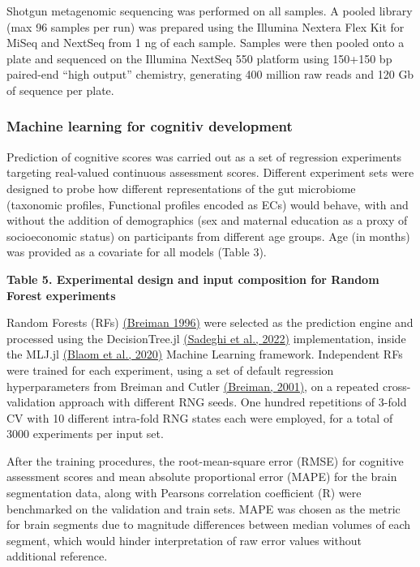 Shotgun metagenomic sequencing was performed on all samples. A pooled
library (max 96 samples per run) was prepared using the Illumina Nextera
Flex Kit for MiSeq and NextSeq from 1 ng of each sample. Samples were
then pooled onto a plate and sequenced on the Illumina NextSeq 550
platform using 150+150 bp paired-end ``high output'' chemistry,
generating 400 million raw reads and 120 Gb of sequence per plate.

\subsubsection{Machine learning for cognitiv
development}

Prediction of cognitive scores was carried out as a set of regression
experiments targeting real-valued continuous assessment scores.
Different experiment sets were designed to probe how different
representations of the gut microbiome (taxonomic profiles, Functional
profiles encoded as ECs) would behave, with and without the addition of
demographics (sex and maternal education as a proxy of socioeconomic
status) on participants from different age groups. Age (in months) was
provided as a covariate for all models (Table 3).

\textbf{Table 5. Experimental design and input composition for Random
Forest experiments}



Random Forests (RFs) \href{https://paperpile.com/c/dPbU4e/VDqU}{(Breiman
1996)} were selected as the prediction engine and processed using the
DecisionTree.jl
\href{https://www.zotero.org/google-docs/?dQLyDs}{(Sadeghi et al.,
2022)} implementation, inside the MLJ.jl
\href{https://www.zotero.org/google-docs/?y8ywGI}{(Blaom et al., 2020)}
Machine Learning framework. Independent RFs were trained for each
experiment, using a set of default regression hyperparameters from
Breiman and Cutler
\href{https://www.zotero.org/google-docs/?d3gqFh}{(Breiman, 2001)}, on a
repeated cross-validation approach with different RNG seeds. One hundred
repetitions of 3-fold CV with 10 different intra-fold RNG states each
were employed, for a total of 3000 experiments per input set.

After the training procedures, the root-mean-square error (RMSE) for
cognitive assessment scores and mean absolute proportional error (MAPE)
for the brain segmentation data, along with Pearson\textquotesingle s
correlation coefficient (R) were benchmarked on the validation and train
sets. MAPE was chosen as the metric for brain segments due to magnitude
differences between median volumes of each segment, which would hinder
interpretation of raw error values without additional reference.

